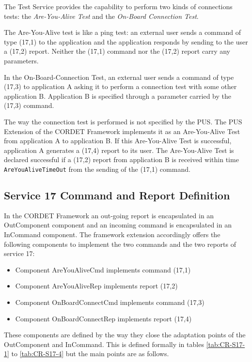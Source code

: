 \documentclass{pnp_article}
\begin{document}
The Test Service provides the capability to perform two kinds of connections tests: the \textit{Are-You-Alive Test} and the \textit{On-Board Connection Test}.

The Are-You-Alive test is like a ping test: an external user sends a command of type (17,1) to the application and the application responds by sending to the user a (17,2) report. Neither the (17,1) command nor the (17,2) report carry any parameters. 

In the On-Board-Connection Test, an external user sends a command of type (17,3) to application A asking it to perform a connection test with some other application B. Application B is specified through a parameter carried by the (17,3) command. 

The way the connection test is performed is not specified by the PUS. The PUS Extension of the CORDET Framework implements it as an Are-You-Alive Test from application A to application B. If this Are-You-Alive Test is successful, application A generates a (17,4) report to its user. The Are-You-Alive Test is declared successful if a (17,2) report from application B is received within time \texttt{AreYouAliveTimeOut} from the sending of the (17,1) command.

\subsection{Service 17 Command and Report Definition}
In the CORDET Framework an out-going report is encapsulated in an OutComponent component and an incoming command is encapsulated in an InCommand component. The framework extension accordingly offers the following components to implement the two commands and the two reports of service 17:

\begin{itemize}
\item Component AreYouAliveCmd implements command (17,1) 
\item Component AreYouAliveRep implements report (17,2) 
\item Component OnBoardConnectCmd implements command (17,3)  
\item Component OnBoardConnectRep implements report (17,4) 
\end{itemize}

These components are defined by the way they close the adaptation points of the OutComponent and InCommand. This is defined formally in tables \ref{tab:CR-S17-1} to \ref{tab:CR-S17-4} but the main points are as follows.
\end{document}
